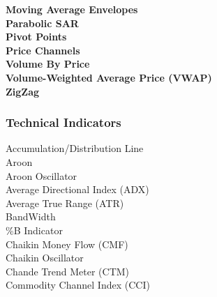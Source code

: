 \documentclass[12pt,a4paper]{article}
\begin{document}
\iffalse
[]
\fi

\textbf{Moving Average Envelopes} \\

\iffalse
[]
\fi

\textbf{Parabolic SAR} \\

\iffalse
[]
\fi

\textbf{Pivot Points} \\

\iffalse
[]
\fi

\textbf{Price Channels} \\

\iffalse
[]
\fi

\textbf{Volume By Price} \\

\iffalse
[]
\fi

\textbf{Volume-Weighted Average Price (VWAP)} \\

\iffalse
[]
\fi

\textbf{ZigZag} \\

\iffalse
[]
\fi


\subsubsection*{Technical Indicators}

Accumulation/Distribution Line \\

Aroon \\

Aroon Oscillator \\

Average Directional Index (ADX) \\

Average True Range (ATR) \\

BandWidth \\

\%B Indicator \\

Chaikin Money Flow (CMF) \\

Chaikin Oscillator \\

Chande Trend Meter (CTM) \\

Commodity Channel Index (CCI) \\
\end{document}

